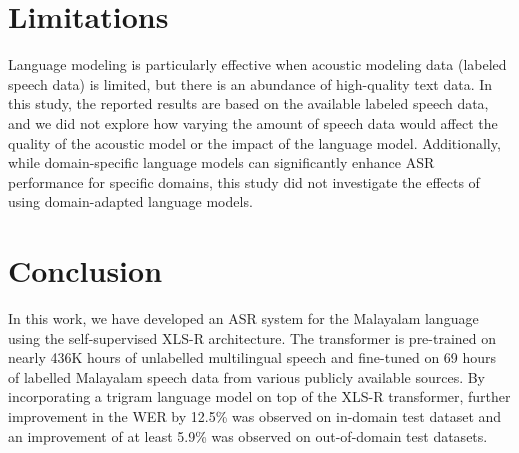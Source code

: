\documentclass[runningheads]{llncs}
\begin{document}





\section{Limitations}
Language modeling is particularly effective when acoustic modeling data (labeled speech data) is limited, but there is an abundance of high-quality text data. In this study, the reported results are based on the available labeled speech data, and we did not explore how varying the amount of speech data would affect the quality of the acoustic model or the impact of the language model. Additionally, while domain-specific language models can significantly enhance ASR performance for specific domains, this study did not investigate the effects of using domain-adapted language models.
\section{Conclusion}

In this work, we have developed an ASR system for the Malayalam language using the self-supervised XLS-R architecture. The transformer is pre-trained on nearly 436K hours of unlabelled multilingual speech and fine-tuned on 69 hours of labelled Malayalam speech data from various publicly available sources. By incorporating a trigram language model on top of the XLS-R transformer, further improvement in the WER by  12.5\% was observed  on in-domain test dataset and an improvement of at least 5.9\% was observed on out-of-domain test datasets. 
\end{document}
